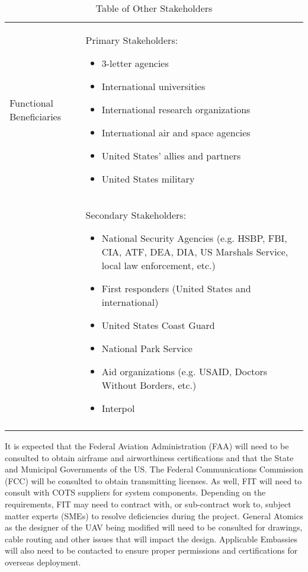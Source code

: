 \begin{fullwidth}
\begin{longtable}{ | p{5cm} | p{12cm} | }
        \hline
        Functional Beneficiaries &
        Primary Stakeholders:
        \begin{itemize}
            \item 3-letter agencies
            \item International universities
            \item International research organizations
            \item International air and space agencies
            \item United States' allies and partners
            \item United States military
        \end{itemize} \\
         &
        Secondary Stakeholders:
        \begin{itemize}
            \item National Security Agencies (e.g. HSBP, FBI, CIA, ATF, DEA, DIA, US Marshals Service, local law enforcement, etc.)
            \item First responders (United States and international)
            \item United States Coast Guard
            \item National Park Service
            \item Aid organizations (e.g. USAID, Doctors Without Borders, etc.)
            \item Interpol
        \end{itemize} \\
        \hline
        \caption{Table of Other Stakeholders}
        \label{tab:other_stakeholders}
    \end{longtable}
    
    It is expected that the Federal Aviation Administration (FAA) will need to be consulted to obtain airframe and airworthiness certifications and that the State and Municipal Governments of the US. The Federal Communications Commission (FCC) will be consulted to obtain transmitting licenses. As well, FIT will need to consult with COTS suppliers for system components. Depending on the requirements, FIT may need to contract with, or sub-contract work to, subject matter experts (SMEs) to resolve deficiencies during the project.  General Atomics as the designer of the UAV being modified will need to be consulted for drawings, cable routing and other issues that will impact the design. Applicable Embassies will also need to be contacted to ensure proper permissions and certifications for overseas deployment.
    

\end{fullwidth}
